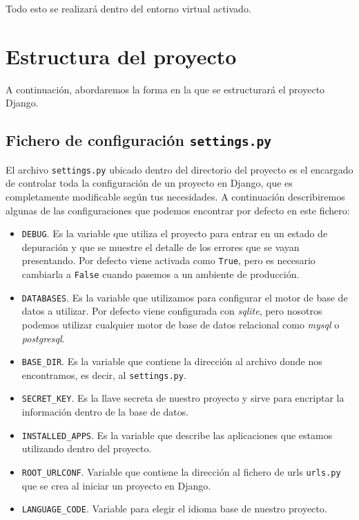 Todo esto se realizará dentro del entorno virtual activado.

\section{Estructura del proyecto}
A continuación, abordaremos la forma en la que se estructurará el proyecto Django.

\subsection{Fichero de configuración \texttt{settings.py}}

El archivo \texttt{settings.py} ubicado dentro del directorio del proyecto es el encargado de controlar toda la configuración de un proyecto en Django, que es completamente modificable según tus necesidades. A continuación describiremos algunas de las configuraciones que podemos encontrar por defecto en este fichero:

\begin{itemize}
	\item \texttt{DEBUG}. Es la variable que utiliza el proyecto para entrar en un estado de depuración y que se muestre el detalle de los errores que se vayan presentando. Por defecto viene activada como \texttt{True}, pero es necesario cambiarla a \texttt{False} cuando pasemos a un ambiente de producción.
	\item \texttt{DATABASES}. Es la variable que utilizamos para configurar el motor de base de datos a utilizar. Por defecto viene configurada con \textit{sqlite}, pero nosotros podemos utilizar cualquier motor de base de datos relacional como \textit{mysql} o \textit{postgresql}.
	\item \texttt{BASE\_DIR}. Es la variable que contiene la dirección al archivo donde nos encontramos, es decir, al \texttt{settings.py}.
	\item \texttt{SECRET\_KEY}. Es la llave secreta de nuestro proyecto y sirve para encriptar la información dentro de la base de datos.
	\item \texttt{INSTALLED\_APPS}. Es la variable que describe las aplicaciones que estamos utilizando dentro del proyecto.
	\item \texttt{ROOT\_URLCONF}. Variable que contiene la dirección al fichero de urls \texttt{urls.py} que se crea al iniciar un proyecto en Django.
	\item \texttt{LANGUAGE\_CODE}. Variable para elegir el idioma base de nuestro proyecto.
\end{itemize}

